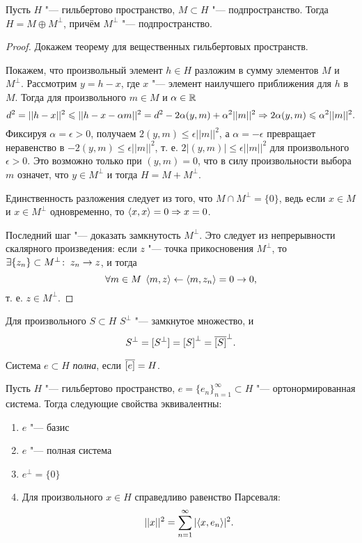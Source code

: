 \documentclass[main]{subfiles}
\begin{document}
\begin{theorem}[о проекции]%
  Пусть \( H \) "--- гильбертово пространство, \( M \subset H \) "---
  подпространство. Тогда \( H = M \oplus M^\perp \),
  причём \( M^\perp \) "--- подпространство.
\end{theorem}
\begin{proof}
  Докажем теорему для вещественных гильбертовых пространств. 

  Покажем, что произвольный элемент \( h \in H \) разложим
  в сумму элементов \( M \) и \( M^\perp \).
  Рассмотрим \( y = h - x \), где \( x \) "---
  элемент наилучшего приближения для \( h \) в \( M \).
  Тогда для произвольного \( m \in M \) и \( \alpha \in \mathbb{R} \)
  \[ d^2 = ||h - x||^2 \leqslant ||h - x - \alpha m||^2 =
  d^2 - 2 \alpha (y, m) + \alpha^2 ||m||^2 \Rightarrow
  2 \alpha (y, m) \leqslant \alpha^2 ||m||^2. \]
  Фиксируя \( \alpha = \epsilon > 0 \),
  получаем \( 2 (y, m) \le \epsilon ||m||^2 \),
  а \( \alpha = -\epsilon \)
  превращает неравенство в \( - 2 (y, m) \le \epsilon ||m||^2 \),
  т. е. \( 2 |(y, m)| \le \epsilon ||m||^2 \) для произвольного \( \epsilon > 0 \).
  Это возможно только при \( (y, m) = 0 \),
  что в силу произвольности выбора \( m \)
  означет, что \( y \in M^\perp \)
  и тогда \( H = M + M^\perp \).

  Единственность разложения следует из того,
  что \( M \cap M^\perp = \{ 0 \} \),
  ведь если \( x \in M \) и \( x \in M^\perp \)
  одновременно, то \( \langle x, x \rangle = 0 \Rightarrow x = 0 \).

  Последний шаг "--- доказать замкнутость \( M^\perp \).
  Это следует из непрерывности скалярного произведения:
  если \( z \) "--- точка прикосновения \( M^\perp \), то
  \( \exists  \{ z_n \} \subset M^\perp  \colon \: z_n \to z \),
  и тогда
  \[ \forall {m \in M} \; \, \langle m, z \rangle \leftarrow \langle m, z_n \rangle = 0 \to 0, \]
  т. е. \( z \in M^\perp \).
\end{proof}

\begin{exercise}
  Для произвольного \( S \subset H \) \( S^\perp \) "--- замкнутое множество,
  и
  \[ S^\perp = [S^\perp] = {[S]}^\perp = \overline{[S]}^\perp. \]
\end{exercise}

\begin{definition}
  Система \( e \subset H \) \emph{полна}, если \( \overline{[e]} = H \).
\end{definition}

\begin{theorem}
  Пусть \( H \) "--- гильбертово пространство,
  \( e = {\{ e_n \}}_{n = 1}^\infty \subset H \) "--- 
  ортонормированная система.
  Тогда следующие свойства эквивалентны:
  \begin{enumerate}
    \item \( e \) "--- базис
    \item \( e \) "--- полная система
    \item \( e^\perp = \{ 0 \} \)
    \item Для произвольного \( x \in H \) справедливо
      равенство Парсеваля:
      \[
	||x||^2 = \sum_{n=1}^\infty |\langle x, e_n \rangle|^2.
      \]
  \end{enumerate}
\end{theorem}
\end{document}
